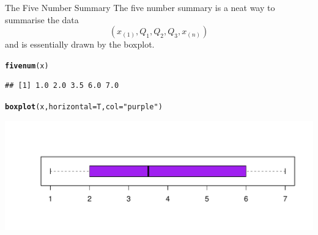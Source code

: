 \documentclass[t,xcolor=pdftex,dvipsnames,table]{beamer}
\makeatletter
\def\maxwidth{ %
  \ifdim\Gin@nat@width>\linewidth
    \linewidth
  \else
    \Gin@nat@width
  \fi
}
\newcommand{\hlstr}[1]{\textcolor[rgb]{0.192,0.494,0.8}{#1}}%
\newcommand{\hlstd}[1]{\textcolor[rgb]{0.345,0.345,0.345}{#1}}%
\newcommand{\hlkwc}[1]{\textcolor[rgb]{0.333,0.667,0.333}{#1}}%
\newcommand{\hlkwd}[1]{\textcolor[rgb]{0.737,0.353,0.396}{\textbf{#1}}}%
\newenvironment{kframe}{%
 \def\at@end@of@kframe{}%
 \ifinner\ifhmode%
  \def\at@end@of@kframe{\end{minipage}}%
  \begin{minipage}{\columnwidth}%
 \fi\fi%
 \def\FrameCommand##1{\hskip\@totalleftmargin \hskip-\fboxsep
 \colorbox{shadecolor}{##1}\hskip-\fboxsep
     \hskip-\linewidth \hskip-\@totalleftmargin \hskip\columnwidth}%
 \MakeFramed {\advance\hsize-\width
   \@totalleftmargin\z@ \linewidth\hsize
   \@setminipage}}%
 {\par\unskip\endMakeFramed%
 \at@end@of@kframe}
\newenvironment{knitrout}{}{} %
\makeatother
\begin{document}
\begin{frame}[fragile]{The Five Number Summary}
The five number summary is a neat way to summarise the data
\[ ( x_{(1)}, Q_{1}, Q_{2}, Q_{3}, x_{(n)} ) \]
and is essentially drawn by the boxplot.

\begin{knitrout}
\color{fgcolor}\begin{kframe}
\begin{alltt}
\hlkwd{fivenum}\hlstd{(x)}
\end{alltt}
\begin{verbatim}
## [1] 1.0 2.0 3.5 6.0 7.0
\end{verbatim}
\begin{alltt}
\hlkwd{boxplot}\hlstd{(x,} \hlkwc{horizontal}\hlstd{=T,} \hlkwc{col}\hlstd{=}\hlstr{"purple"}\hlstd{)}
\end{alltt}
\end{kframe}
\includegraphics[width=\maxwidth]{figure/unnamed-chunk-16-1} 

\end{knitrout}
\end{frame}
\end{document}
